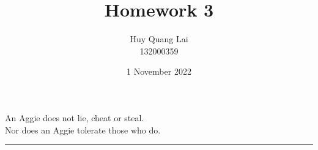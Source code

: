 \documentclass[fleqn,12pt]{article}
\title{\vspace{-2.5cm}Homework 3}
\author{\vspace{-0.2cm} Huy Quang Lai\\132000359}
\affil{Texas A\&M University}
\date{\vspace{-0.5cm}1 November 2022}
\begin{document}
\maketitle
\begin{center}
{\large
An Aggie does not lie, cheat or steal.\\
Nor does an Aggie tolerate those who do.
}
\rule{\textwidth}{.1pt}
\end{center}


\end{document}
